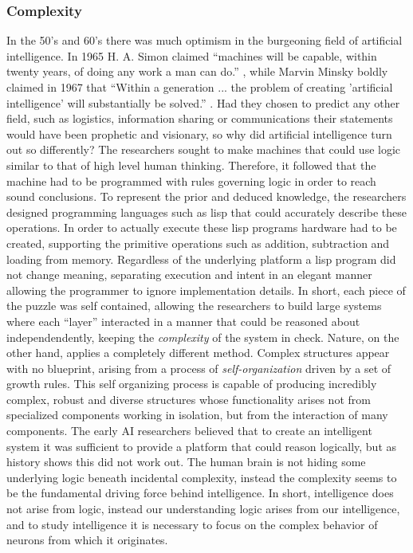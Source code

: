 \subsubsection{Complexity}
In the 50's and 60's there was much optimism in the burgeoning field of
artificial intelligence. In 1965 H. A. Simon claimed ``machines will be capable,
within twenty years, of doing any work a man can
do.''\cite{vardi_artificial_nodate} , while Marvin Minsky boldly claimed in 1967
that ``Within a generation ... the problem of creating 'artificial intelligence'
will substantially be solved.'' \cite{noauthor_marvin_nodate}.
Had they chosen to predict any other field, such as logistics, information
sharing or communications their statements would have been prophetic and
visionary, so why did artificial intelligence turn out so differently?
%
The researchers sought to make machines that could use logic similar to that of
high level human thinking.
%
Therefore, it followed that the machine had to be programmed with rules
governing logic in order to reach sound conclusions.
%
To represent the prior and deduced knowledge, the researchers designed
programming languages such as lisp that could accurately describe these
operations.
%
In order to actually execute these lisp programs hardware had to be created,
supporting the primitive operations such as addition, subtraction and loading
from memory.
%
Regardless of the underlying platform a lisp program did not change meaning,
separating execution and intent in an elegant manner allowing the programmer to
ignore implementation details.
%
In short, each piece of the puzzle was self contained, allowing the researchers 
to build large systems where each ``layer'' interacted in a manner that could be
reasoned about independendently, keeping the \emph{complexity} of the system in
check.
%
Nature, on the other hand, applies a completely different method.
Complex structures appear with no blueprint, arising from a process of
\emph{self-organization} driven by a set of growth rules.
%
This self organizing process is capable of producing incredibly complex, robust
and diverse structures whose functionality arises not from specialized
components working in isolation, but from the interaction of many components.
%
The early AI researchers believed that to create an intelligent system it was
sufficient to provide a platform that could reason logically, but as history
shows this did not work out.
%
The human brain is not hiding some underlying logic beneath incidental
complexity, instead the complexity seems to be the fundamental driving force
behind intelligence.
In short, intelligence does not arise from logic, instead our understanding
logic arises from our intelligence, and to study intelligence it is necessary to
focus on the complex behavior of neurons from which it originates.
